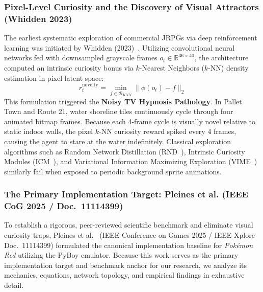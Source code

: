 \documentclass[journal,10pt,twocolumn]{IEEEtran}
\begin{document}
\subsubsection{Pixel-Level Curiosity and the Discovery of Visual Attractors (Whidden 2023)}
The earliest systematic exploration of commercial JRPGs via deep reinforcement learning was initiated by Whidden (2023)~\cite{whidden2023pokemonred}. Utilizing convolutional neural networks fed with downsampled grayscale frames $o_t \in \mathbb{R}^{36 \times 40}$, the architecture computed an intrinsic curiosity bonus via $k$-Nearest Neighbors ($k$-NN) density estimation in pixel latent space:
\begin{equation}
r_t^{\text{novelty}} = \min_{f \in \mathcal{B}_{KNN}} \| \phi(o_t) - f \|_2
\end{equation}
This formulation triggered the \textbf{Noisy TV Hypnosis Pathology}. In Pallet Town and Route 21, water shoreline tiles continuously cycle through four animated bitmap frames. Because each 4-frame cycle is visually novel relative to static indoor walls, the pixel $k$-NN curiosity reward spiked every 4 frames, causing the agent to stare at the water indefinitely. Classical exploration algorithms such as Random Network Distillation (RND~\cite{burda2019rnd}), Intrinsic Curiosity Modules (ICM~\cite{pathak2017curiosity}), and Variational Information Maximizing Exploration (VIME~\cite{houthooft2016vime}) similarly fail when exposed to periodic background sprite animations.

\subsubsection{The Primary Implementation Target: Pleines et al. (IEEE CoG 2025 / Doc.~11114399)}
\label{sec:pleines_baseline}
To establish a rigorous, peer-reviewed scientific benchmark and eliminate visual curiosity traps, Pleines et al.~\cite{pleines2025pokemon} (IEEE Conference on Games 2025 / IEEE Xplore Doc.~11114399) formulated the canonical implementation baseline for \textit{Pok{\'e}mon Red} utilizing the PyBoy emulator. Because this work serves as the primary implementation target and benchmark anchor for our research, we analyze its mechanics, equations, network topology, and empirical findings in exhaustive detail.
\end{document}
